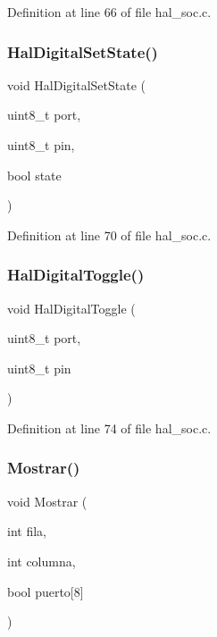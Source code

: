 Definition at line 66 of file hal\+\_\+soc.\+c.

\mbox{\label{group__hal_ga39d2ad5555371ff5f398232bac297c27}} 
\subsubsection{\texorpdfstring{Hal\+Digital\+Set\+State()}{HalDigitalSetState()}}
{\footnotesize\ttfamily void Hal\+Digital\+Set\+State (\begin{DoxyParamCaption}\item[{uint8\+\_\+t}]{port,  }\item[{uint8\+\_\+t}]{pin,  }\item[{bool}]{state }\end{DoxyParamCaption})}



Definition at line 70 of file hal\+\_\+soc.\+c.

\mbox{\label{group__hal_ga2c201a4dc2dbf1edddd7e217dae998f2}} 
\subsubsection{\texorpdfstring{Hal\+Digital\+Toggle()}{HalDigitalToggle()}}
{\footnotesize\ttfamily void Hal\+Digital\+Toggle (\begin{DoxyParamCaption}\item[{uint8\+\_\+t}]{port,  }\item[{uint8\+\_\+t}]{pin }\end{DoxyParamCaption})}



Definition at line 74 of file hal\+\_\+soc.\+c.

\mbox{\label{group__hal_ga7e9fb7e2720d8c47b1a8d14d7857b5c1}} 
\subsubsection{\texorpdfstring{Mostrar()}{Mostrar()}}
{\footnotesize\ttfamily void Mostrar (\begin{DoxyParamCaption}\item[{int}]{fila,  }\item[{int}]{columna,  }\item[{bool}]{puerto\mbox{[}8\mbox{]} }\end{DoxyParamCaption})}




